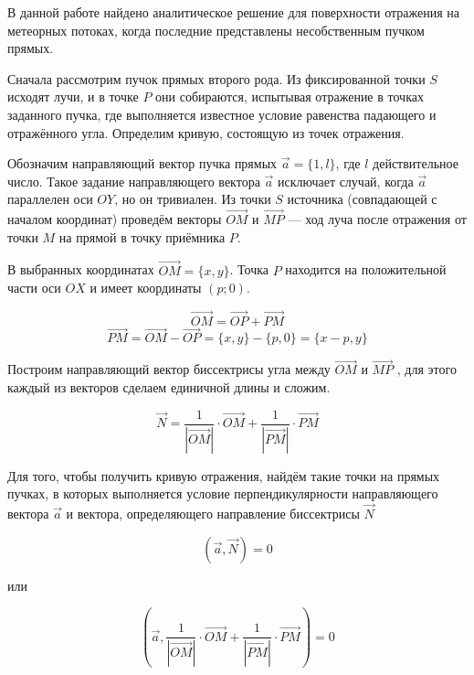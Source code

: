 



\vzmscaption


В данной работе найдено аналитическое решение для поверхности отражения на метеорных потоках, когда последние представлены несобственным пучком прямых.

Сначала рассмотрим пучок прямых второго рода. Из фиксированной точки $S$ исходят лучи, и в точке $P$ они собираются, испытывая отражение в точках заданного пучка, где выполняется известное условие равенства падающего и отражённого угла. Определим кривую, состоящую из точек отражения.

Обозначим направляющий вектор пучка прямых $\vec a = \{ 1,l \}$, где $l$ действительное число. Такое задание направляющего вектора $\vec a $ исключает случай, когда $\vec a $ параллелен оси $ OY$, но он тривиален. Из точки $S$ источника (совпадающей с началом координат) проведём векторы $\overrightarrow{OM}$ и $\overrightarrow{MP}$ --- ход луча после отражения от точки $M$ на прямой в точку приёмника $P$.

В выбранных координатах $\overrightarrow{OM}=\{x,y\}$. Точка $P$ находится на положительной части оси $OX$ и имеет координаты $(p;0)$.


$$\overrightarrow{OM}=\overrightarrow{OP}+\overrightarrow{PM}$$
$$\overrightarrow{PM}=\overrightarrow{OM}-\overrightarrow{OP}=\{x,y\}-\{p,0\}=\{x-p,y\}$$

Построим направляющий вектор биссектрисы   угла между $\overrightarrow{OM}$ и $\overrightarrow{MP}$ , для этого каждый из векторов сделаем единичной длины и сложим.


$$ \vec{N}=\frac{1}{|\overrightarrow{OM}|}\cdot\overrightarrow{OM}+\frac{1}{|\overrightarrow{PM}|}\cdot\overrightarrow{PM} $$



Для того, чтобы получить кривую отражения, найдём такие точки на прямых пучках,
в которых выполняется условие перпендикулярности направляющего вектора $\vec a$ и  вектора,
определяющего направление биссектрисы $\vec N$

$$(\vec a,\vec N )=0$$

или

$$\left(\vec a,\frac{1}{|\overrightarrow{OM}|}\cdot\overrightarrow{OM}+\frac{1}{|\overrightarrow{PM}|}\cdot\overrightarrow{PM}\right) =0$$



